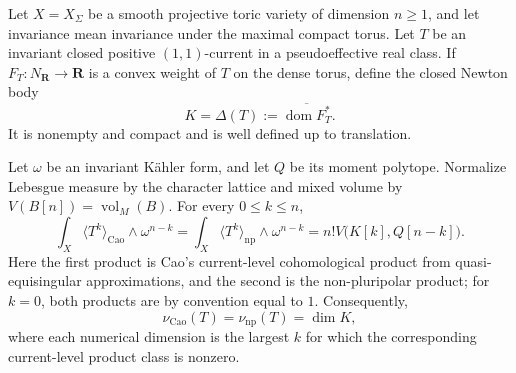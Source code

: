\begin{theorem}
Let \(X=X_\Sigma\) be a smooth projective toric variety of dimension
\(n\geq1\), and let invariance mean invariance under the maximal compact
torus.  Let \(T\) be an invariant closed positive \((1,1)\)-current in a
pseudoeffective real class.  If \(F_T:N_{\mathbf R}\to\mathbf R\) is a
convex weight of \(T\) on the dense torus, define the closed Newton body
\[
                    K=\Delta(T):=
                    \overline{\operatorname{dom}F_T^*}.
\]
It is nonempty and compact and is well defined up to translation.

Let \(\omega\) be an invariant K\"ahler form, and let \(Q\) be its moment
polytope.  Normalize Lebesgue measure by the character lattice and mixed
volume by \(V(B[n])=\operatorname{vol}_M(B)\).  For every
\(0\leq k\leq n\),
\[
 \int_X\langle T^k\rangle_{\mathrm{Cao}}\wedge\omega^{n-k}
 =\int_X\langle T^k\rangle_{\mathrm{np}}\wedge\omega^{n-k}
 =n!V\bigl(K[k],Q[n-k]\bigr).
\]
Here the first product is Cao's current-level cohomological product from
quasi-equisingular approximations, and the second is the non-pluripolar
product; for \(k=0\), both products are by convention equal to \(1\).
Consequently,
\[
                    \nu_{\mathrm{Cao}}(T)
                    =\nu_{\mathrm{np}}(T)
                    =\dim K,
\]
where each numerical dimension is the largest \(k\) for which the
corresponding current-level product class is nonzero.
\end{theorem}

